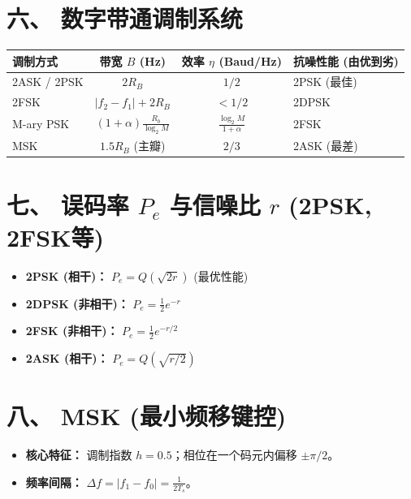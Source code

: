 \documentclass[11pt,a4paper]{ctexart} %
\begin{document}
\section{六、 数字带通调制系统}
\renewcommand{\arraystretch}{1.3} %
\begin{table}[h]
\centering
{} %
\begin{tabularx}{\textwidth}{l|c|c|l}
\toprule
\textbf{调制方式} & \textbf{带宽 $B$ (Hz)} & \textbf{效率 $\eta$ (Baud/Hz)} & \textbf{抗噪性能 (由优到劣)} \\ \midrule
2ASK / 2PSK & $2R_B$ & $1/2$ & 2PSK (最佳) \\
2FSK & $|f_2 - f_1| + 2R_B$ & $< 1/2$ & 2DPSK \\
M-ary PSK & $(1+\alpha) \frac{R_b}{\log_2 M}$ & $\frac{\log_2 M}{1+\alpha}$ & 2FSK \\
MSK & $1.5R_B$ (主瓣) & $2/3$ & 2ASK (最差) \\ \bottomrule
\end{tabularx}
\end{table}

\section{七、 误码率 $P_e$ 与信噪比 $r$ (2PSK, 2FSK等)}
\begin{itemize}
    \item \textbf{2PSK (相干)：} $P_e = Q(\sqrt{2r})$ \quad (最优性能)
    \item \textbf{2DPSK (非相干)：} $P_e = \frac{1}{2} e^{-r}$
    \item \textbf{2FSK (非相干)：} $P_e = \frac{1}{2} e^{-r/2}$
    \item \textbf{2ASK (相干)：} $P_e = Q(\sqrt{r/2})$
\end{itemize}

\section{八、 MSK (最小频移键控)}
\begin{itemize}
    \item \textbf{核心特征：} 调制指数 $h = 0.5$；相位在一个码元内偏移 $\pm \pi/2$。
    \item \textbf{频率间隔：} $\Delta f = |f_1 - f_0| = \frac{1}{2T_s}$。
\end{itemize}
\end{document}
